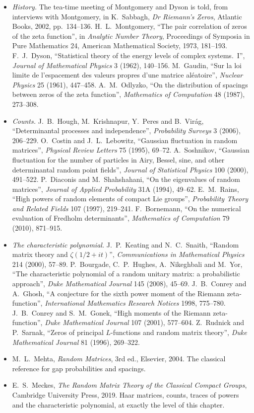 \begin{itemize}
\item \emph{History.} The tea-time meeting of Montgomery and Dyson is told, from interviews with Montgomery, in K.~Sabbagh, \emph{Dr Riemann's Zeros}, Atlantic Books, 2002, pp.~134--136. H.~L.~Montgomery, ``The pair correlation of zeros
of the zeta function'', in \emph{Analytic Number Theory}, Proceedings of Symposia in Pure Mathematics 24, American Mathematical Society, 1973, 181--193. F.~J.~Dyson, ``Statistical theory of the energy levels of complex systems.~I'',
\emph{Journal of Mathematical Physics} 3 (1962), 140--156. M.~Gaudin, ``Sur la loi limite de l'espacement des valeurs propres d'une matrice al\'eatoire'', \emph{Nuclear Physics} 25 (1961), 447--458. A.~M.~Odlyzko, ``On the distribution of
spacings between zeros of the zeta function'', \emph{Mathematics of Computation} 48 (1987), 273--308.
\item \emph{Counts.} J.~B.~Hough, M.~Krishnapur, Y.~Peres and B.~Vir\'ag, ``Determinantal processes and independence'', \emph{Probability Surveys} 3 (2006), 206--229. O.~Costin and J.~L.~Lebowitz, ``Gaussian fluctuation in random
matrices'', \emph{Physical Review Letters} 75 (1995), 69--72. A.~Soshnikov, ``Gaussian fluctuation for the number of particles in Airy, Bessel, sine, and other determinantal random point fields'', \emph{Journal of Statistical Physics} 100
(2000), 491--522. P.~Diaconis and M.~Shahshahani, ``On the eigenvalues of random matrices'', \emph{Journal of Applied Probability} 31A (1994), 49--62. E.~M.~Rains, ``High powers of random elements of compact Lie groups'', \emph{Probability
Theory and Related Fields} 107 (1997), 219--241. F.~Bornemann, ``On the numerical evaluation of Fredholm determinants'', \emph{Mathematics of Computation} 79 (2010), 871--915.
\item \emph{The characteristic polynomial.} J.~P.~Keating and N.~C.~Snaith, ``Random matrix theory and $\zeta(1/2+it)$'', \emph{Communications in Mathematical Physics} 214 (2000), 57--89. P.~Bourgade, C.~P.~Hughes, A.~Nikeghbali and
M.~Yor, ``The characteristic polynomial of a random unitary matrix: a probabilistic approach'', \emph{Duke Mathematical Journal} 145 (2008), 45--69. J.~B.~Conrey and A.~Ghosh, ``A conjecture for the sixth power moment of the Riemann
zeta-function'', \emph{International Mathematics Research Notices} 1998, 775--780. J.~B.~Conrey and S.~M.~Gonek, ``High moments of the Riemann zeta-function'', \emph{Duke Mathematical Journal} 107 (2001), 577--604. Z.~Rudnick and
P.~Sarnak, ``Zeros of principal $L$-functions and random matrix theory'', \emph{Duke Mathematical Journal} 81 (1996), 269--322.
\item M.~L.~Mehta, \emph{Random Matrices}, 3rd ed., Elsevier, 2004. The classical reference for gap probabilities and spacings.
\item E.~S.~Meckes, \emph{The Random Matrix Theory of the Classical Compact Groups}, Cambridge University Press, 2019. Haar matrices, counts, traces of powers and the characteristic polynomial, at exactly the level of this chapter.
\end{itemize}
